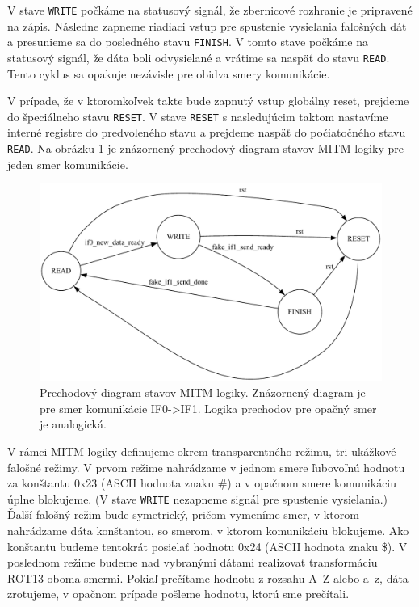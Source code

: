 V stave \texttt{WRITE} počkáme na statusový signál, že zbernicové rozhranie je pripravené na zápis. Následne zapneme riadiaci vstup pre spustenie vysielania falošných dát a presunieme sa do posledného stavu \texttt{FINISH}. V tomto stave počkáme na statusový signál, že dáta boli odvysielané a vrátime sa naspäť do stavu \texttt{READ}. Tento cyklus sa opakuje nezávisle pre obidva smery komunikácie.

V prípade, že v ktoromkoľvek takte bude zapnutý vstup globálny reset, prejdeme do špeciálneho stavu \texttt{RESET}. V stave \texttt{RESET} s nasledujúcim taktom nastavíme interné registre do predvoleného stavu a prejdeme naspäť do počiatočného stavu \texttt{READ}. Na obrázku \ref{obr:mitmStateTransition} je znázornený prechodový diagram stavov MITM logiky pre jeden smer komunikácie.

\begin{figure}
    \centerline{\includegraphics[width=1\textwidth]{images/misc/mitmStateTransition.pdf}}
    \caption[Prechodový diagram stavov MITM logiky]{Prechodový diagram stavov MITM logiky. Znázornený diagram je pre smer komunikácie IF0->IF1. Logika prechodov pre opačný smer je analogická.}
    \label{obr:mitmStateTransition}
\end{figure}

V rámci MITM logiky definujeme okrem transparentného režimu, tri ukážkové falošné režimy. V prvom režime nahrádzame v jednom smere ľubovoľnú hodnotu za konštantu 0x23 (ASCII hodnota znaku \#) a v opačnom smere komunikáciu úplne blokujeme. (V stave \texttt{WRITE} nezapneme signál pre spustenie vysielania.) Ďalší falošný režim bude symetrický, pričom vymeníme smer, v ktorom nahrádzame dáta konštantou, so smerom, v ktorom komunikáciu blokujeme. Ako konštantu budeme tentokrát posielať hodnotu 0x24 (ASCII hodnota znaku \$). V poslednom režime budeme nad vybranými dátami realizovať transformáciu ROT13 oboma smermi. Pokiaľ prečítame hodnotu z rozsahu A--Z alebo a--z, dáta zrotujeme, v opačnom prípade pošleme hodnotu, ktorú sme prečítali.

